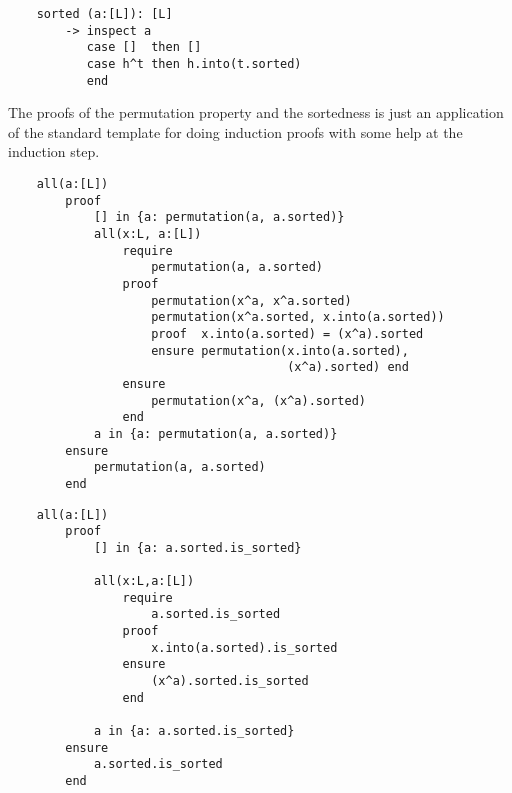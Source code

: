 \begin{lstlisting}
    sorted (a:[L]): [L]
        -> inspect a
           case []  then [] 
           case h^t then h.into(t.sorted)
           end
\end{lstlisting}

The proofs of the permutation property and the sortedness is just an
application of the standard template for doing induction proofs with some help
at the induction step.

\begin{lstlisting}
    all(a:[L])
        proof
            [] in {a: permutation(a, a.sorted)}
            all(x:L, a:[L])
                require
                    permutation(a, a.sorted)
                proof
                    permutation(x^a, x^a.sorted)
                    permutation(x^a.sorted, x.into(a.sorted))
                    proof  x.into(a.sorted) = (x^a).sorted
                    ensure permutation(x.into(a.sorted),
                                       (x^a).sorted) end
                ensure
                    permutation(x^a, (x^a).sorted)
                end
            a in {a: permutation(a, a.sorted)}
        ensure
            permutation(a, a.sorted)
        end
\end{lstlisting}

\begin{lstlisting}
    all(a:[L])
        proof
            [] in {a: a.sorted.is_sorted}

            all(x:L,a:[L])
                require
                    a.sorted.is_sorted
                proof
                    x.into(a.sorted).is_sorted
                ensure
                    (x^a).sorted.is_sorted
                end

            a in {a: a.sorted.is_sorted}
        ensure
            a.sorted.is_sorted
        end
\end{lstlisting}


